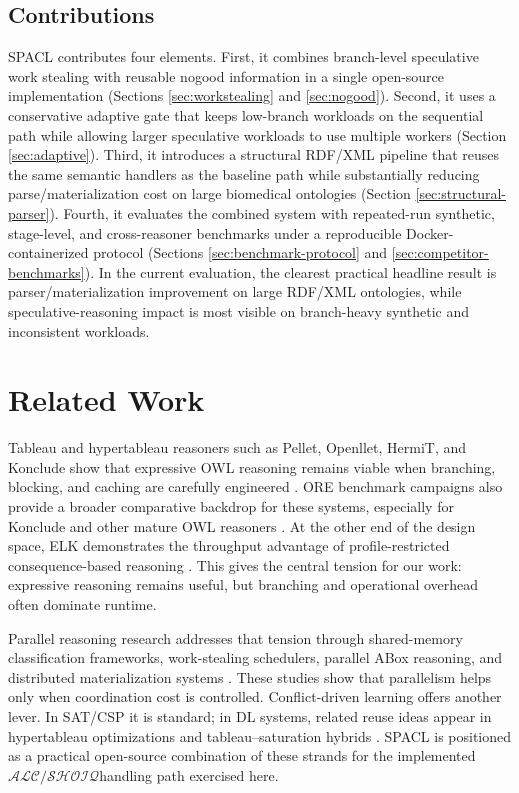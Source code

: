 \documentclass[preprint,12pt,times]{elsarticle}
\newcommand{\dlfrag}{\ensuremath{\mathcal{ALC/SHOIQ}}}
\begin{document}
\subsection{Contributions}
\label{sec:contributions}

SPACL contributes four elements. First, it combines branch-level speculative work stealing with reusable nogood information in a single open-source implementation (Sections \ref{sec:workstealing} and \ref{sec:nogood}). Second, it uses a conservative adaptive gate that keeps low-branch workloads on the sequential path while allowing larger speculative workloads to use multiple workers (Section \ref{sec:adaptive}). Third, it introduces a structural RDF/XML pipeline that reuses the same semantic handlers as the baseline path while substantially reducing parse/materialization cost on large biomedical ontologies (Section \ref{sec:structural-parser}). Fourth, it evaluates the combined system with repeated-run synthetic, stage-level, and cross-reasoner benchmarks under a reproducible Docker-containerized protocol (Sections \ref{sec:benchmark-protocol} and \ref{sec:competitor-benchmarks}). In the current evaluation, the clearest practical headline result is parser/materialization improvement on large RDF/XML ontologies, while speculative-reasoning impact is most visible on branch-heavy synthetic and inconsistent workloads.

\section{Related Work}
\label{sec:related}

Tableau and hypertableau reasoners such as Pellet, Openllet, HermiT, and Konclude show that expressive OWL reasoning remains viable when branching, blocking, and caching are carefully engineered \cite{pellet,openllet,hermit,konclude,motik2009hypertableau}. ORE benchmark campaigns also provide a broader comparative backdrop for these systems, especially for Konclude and other mature OWL reasoners \cite{parsia2015ore}. At the other end of the design space, ELK demonstrates the throughput advantage of profile-restricted consequence-based reasoning \cite{elk}. This gives the central tension for our work: expressive reasoning remains useful, but branching and operational overhead often dominate runtime.

Parallel reasoning research addresses that tension through shared-memory classification frameworks, work-stealing schedulers, parallel ABox reasoning, and distributed materialization systems \cite{quan2017parallel,quan2019framework,workstealing,steigmiller2020parallelised,liu2017spowl,gu2015cichlid,benitez2023nora}. These studies show that parallelism helps only when coordination cost is controlled. Conflict-driven learning offers another lever. In SAT/CSP it is standard; in DL systems, related reuse ideas appear in hypertableau optimizations and tableau--saturation hybrids \cite{marques1999grasp,glorian2020nacre,motik2009hypertableau,song2013complete,glimm2014coupling}. SPACL is positioned as a practical open-source combination of these strands for the implemented \dlfrag handling path exercised here.
\end{document}
